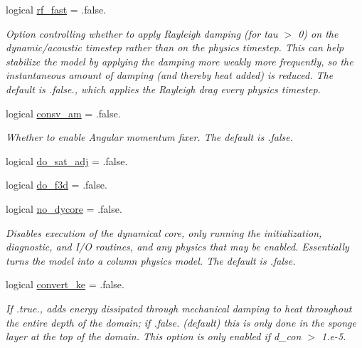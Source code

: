 \begin{DoxyCompactItemize}
logical \hyperlink{structfv__arrays__mod_1_1fv__flags__type_a1c474ace44c4f507b091496eabf667bd}{rf\-\_\-fast} = .false.
\begin{DoxyCompactList}\small\item\em Option controlling whether to apply Rayleigh damping (for tau $>$ 0) on the dynamic/acoustic timestep rather than on the physics timestep. This can help stabilize the model by applying the damping more weakly more frequently, so the instantaneous amount of damping (and thereby heat added) is reduced. The default is .false., which applies the Rayleigh drag every physics timestep. \end{DoxyCompactList}\item 
logical \hyperlink{structfv__arrays__mod_1_1fv__flags__type_abcebc94566be36845e4285c6a024751d}{consv\-\_\-am} = .false.
\begin{DoxyCompactList}\small\item\em Whether to enable Angular momentum fixer. The default is .false. \end{DoxyCompactList}\item 
logical \hyperlink{structfv__arrays__mod_1_1fv__flags__type_a600463f131f3b1df30dcf333938c7a39}{do\-\_\-sat\-\_\-adj} = .false.
\item 
logical \hyperlink{structfv__arrays__mod_1_1fv__flags__type_a9cfcad9b998983b7a1e1d89ea1c76022}{do\-\_\-f3d} = .false.
\item 
logical \hyperlink{structfv__arrays__mod_1_1fv__flags__type_a0a66c1a0702f0b0f039d879e1bf70dec}{no\-\_\-dycore} = .false.
\begin{DoxyCompactList}\small\item\em Disables execution of the dynamical core, only running the initialization, diagnostic, and I/\-O routines, and any physics that may be enabled. Essentially turns the model into a column physics model. The default is .false. \end{DoxyCompactList}\item 
logical \hyperlink{structfv__arrays__mod_1_1fv__flags__type_a5facb1d2f072eb7a3c2d20b3b03bb068}{convert\-\_\-ke} = .false.
\begin{DoxyCompactList}\small\item\em If .true., adds energy dissipated through mechanical damping to heat throughout the entire depth of the domain; if .false. (default) this is only done in the sponge layer at the top of the domain. This option is only enabled if d\-\_\-con $>$ 1.\-e-\/5. \end{DoxyCompactList}\item 

\end{DoxyCompactItemize}

